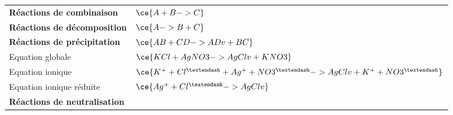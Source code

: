\documentclass[
  11pt,
  french,
  a4paper,
  openany]{book}
\begin{document}
\begin{longtable}[]{@{}ll@{}}
\toprule
\endhead
\begin{minipage}[t]{0.29\columnwidth}\raggedright
\textbf{Réactions de combinaison}\strut
\end{minipage} & \begin{minipage}[t]{0.65\columnwidth}\raggedright
\(\ce{A + B -> C}\)\strut
\end{minipage}\tabularnewline
\begin{minipage}[t]{0.29\columnwidth}\raggedright
\textbf{Réactions de décomposition}\strut
\end{minipage} & \begin{minipage}[t]{0.65\columnwidth}\raggedright
\(\ce{A -> B + C}\)\strut
\end{minipage}\tabularnewline
\begin{minipage}[t]{0.29\columnwidth}\raggedright
\textbf{Réactions de précipitation}\strut
\end{minipage} & \begin{minipage}[t]{0.65\columnwidth}\raggedright
\(\ce{AB + CD -> AD v + BC}\)\strut
\end{minipage}\tabularnewline
\begin{minipage}[t]{0.29\columnwidth}\raggedright
Equation globale\strut
\end{minipage} & \begin{minipage}[t]{0.65\columnwidth}\raggedright
\(\ce{KCl + AgNO3 -> AgCl v + KNO3}\)\strut
\end{minipage}\tabularnewline
\begin{minipage}[t]{0.29\columnwidth}\raggedright
Equation ionique\strut
\end{minipage} & \begin{minipage}[t]{0.65\columnwidth}\raggedright
\(\ce{K^{+} + Cl^{–} + Ag^{+} + NO3^{–} -> AgCl v + K^{+} + NO3^{–}}\)\strut
\end{minipage}\tabularnewline
\begin{minipage}[t]{0.29\columnwidth}\raggedright
Equation ionique réduite\strut
\end{minipage} & \begin{minipage}[t]{0.65\columnwidth}\raggedright
\(\ce{Ag^{+} + Cl^{–} -> AgCl v}\)\strut
\end{minipage}\tabularnewline
\begin{minipage}[t]{0.29\columnwidth}\raggedright
\textbf{Réactions de neutralisation}\strut
\end{minipage} & \begin{minipage}[t]{0.65\columnwidth}\raggedright

\end{minipage}
\end{longtable}
\end{document}
